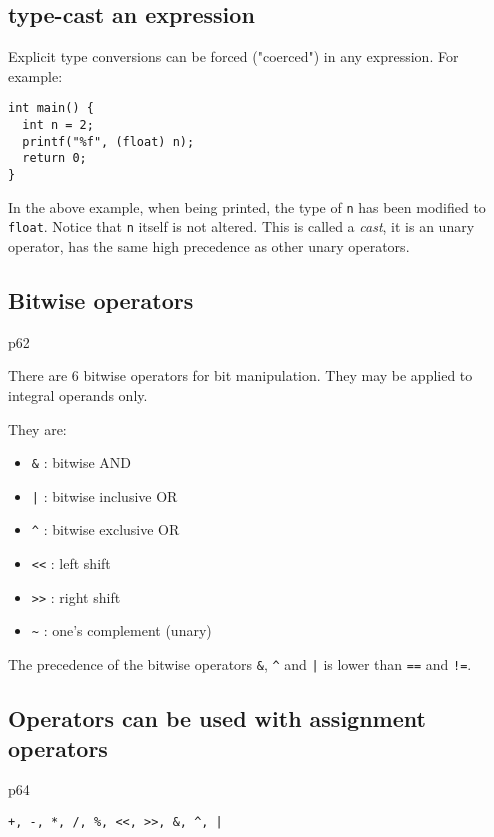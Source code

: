\documentclass[12pt]{article}
\begin{document}
\subsection{type-cast an expression}
\label{sec:org476ace6}
Explicit type conversions can be forced ("coerced") in any expression. For example:
\begin{verbatim}
int main() {
  int n = 2;
  printf("%f", (float) n);
  return 0;
}
\end{verbatim}
In the above example, when being printed, the type of \texttt{n} has been modified to \texttt{float}. Notice that \texttt{n} itself is not altered. This is called a \emph{cast}, it is an unary operator, has the same high precedence as other unary operators.
\subsection{Bitwise operators}
\label{sec:org8994b42}
p62

There are 6 bitwise operators for bit manipulation. They may be applied to integral operands only.

They are:
\begin{itemize}
\item \texttt{\&}  : bitwise AND
\item \texttt{|}  : bitwise inclusive OR
\item \texttt{\textasciicircum{}}  : bitwise exclusive OR
\item \texttt{<<} : left shift
\item \texttt{>>} : right shift
\item \texttt{\textasciitilde{}}  : one's complement (unary)
\end{itemize}

The precedence of the bitwise operators \texttt{\&}, \texttt{\textasciicircum{}} and \texttt{|} is lower than \texttt{==} and \texttt{!=}.
\subsection{Operators can be used with assignment operators}
\label{sec:org4da612c}
p64

\texttt{+, -, *, /, \%, <<, >>, \&, \textasciicircum{}, |}
\end{document}
